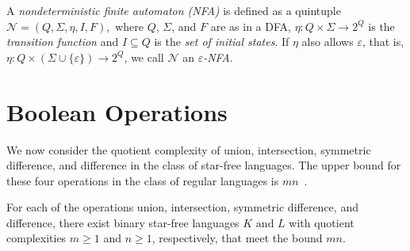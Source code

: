 \documentclass{llncs}
\renewcommand{\ge}{\geqslant}
\newcommand{\eps}{\varepsilon}
\newcommand{\cN}{{\mathcal N}}
\begin{document}
A \emph{nondeterministic finite automaton  (NFA)} is defined as a quintuple
$\mathcal{N}=(Q,\Sigma,\eta,I,F),$
 where 
 $Q$, $\Sigma$, and $F$ are as in a DFA, 
 $\eta:Q\times\Sigma\rightarrow 2^{Q}$ is the \emph{transition function} and
 $I\subseteq Q$ is the \emph{set of initial states}. 
If $\eta$ also allows $\eps$, 
that is, $\eta:Q\times(\Sigma\cup\{\eps\})\rightarrow 2^{Q}$, 
we call $\cN$ an \emph{$\eps$-NFA}.




\section{Boolean Operations}
\label{sec:boolean}
We now consider the quotient complexity of  union, intersection, symmetric difference, and difference in the class of star-free languages. 
The upper bound for these four operations in the class of regular languages is $mn$~\cite{Brz10,Mas70,YZS94}.



\begin{theorem}
\label{thm:boolean}
For each of the operations  union, intersection, symmetric difference, and difference, there exist binary star-free languages $K$ and $L$ with quotient complexities $m\ge 1$ and $n\ge 1$, respectively, that meet the bound $mn$.
\end{theorem}
\end{document}
